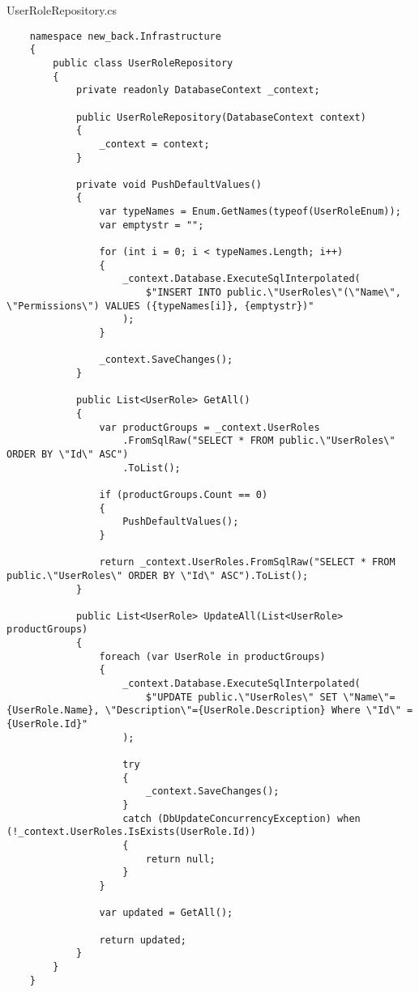 UserRoleRepository.cs
\lstset{style=sharpc}
\begin{lstlisting}
    namespace new_back.Infrastructure
    {
        public class UserRoleRepository
        {
            private readonly DatabaseContext _context;
            
            public UserRoleRepository(DatabaseContext context)
            {
                _context = context;
            }
    
            private void PushDefaultValues()
            {
                var typeNames = Enum.GetNames(typeof(UserRoleEnum));
                var emptystr = "";
    
                for (int i = 0; i < typeNames.Length; i++)
                {
                    _context.Database.ExecuteSqlInterpolated(
                        $"INSERT INTO public.\"UserRoles\"(\"Name\", \"Permissions\") VALUES ({typeNames[i]}, {emptystr})"
                    );
                }
                
                _context.SaveChanges();
            }
            
            public List<UserRole> GetAll()
            {
                var productGroups = _context.UserRoles
                    .FromSqlRaw("SELECT * FROM public.\"UserRoles\" ORDER BY \"Id\" ASC")
                    .ToList();
    
                if (productGroups.Count == 0)
                {
                    PushDefaultValues();
                }
                
                return _context.UserRoles.FromSqlRaw("SELECT * FROM public.\"UserRoles\" ORDER BY \"Id\" ASC").ToList();
            }
            
            public List<UserRole> UpdateAll(List<UserRole> productGroups)
            {
                foreach (var UserRole in productGroups)
                {
                    _context.Database.ExecuteSqlInterpolated(
                        $"UPDATE public.\"UserRoles\" SET \"Name\"={UserRole.Name}, \"Description\"={UserRole.Description} Where \"Id\" = {UserRole.Id}"
                    );
                    
                    try
                    {
                        _context.SaveChanges();
                    }
                    catch (DbUpdateConcurrencyException) when (!_context.UserRoles.IsExists(UserRole.Id))
                    {
                        return null;
                    }
                }
    
                var updated = GetAll();
    
                return updated;
            }
        }
    }
\end{lstlisting}

